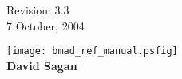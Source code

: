 \thispagestyle{empty}

\begin{flushright}
\large
  Revision: 3.3 \\
  7 October, 2004 \\
\end{flushright}

\vfill

{
\begin{center}
\texttt{[image: bmad\_ref\_manual.psfig]} \\
\vskip 0.3in
\huge\bf David Sagan
\end{center}
}

\vfill
\break